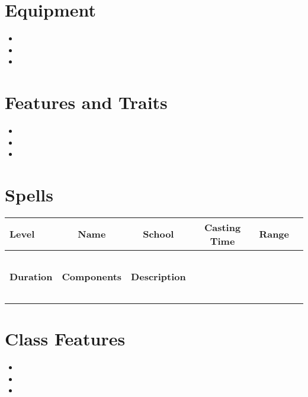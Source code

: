 \documentclass[12pt]{article}
\begin{document}
\section{Equipment}
\begin{itemize}[leftmargin=*]
\item 
\item 
\item 
\end{itemize}

\section{Features and Traits}
\begin{itemize}[leftmargin=*]
\item 
\item 
\item 
\end{itemize}

\section{Spells}
\begin{tabularx}{\linewidth}{lcccc}
\toprule
\textbf{Level} & \textbf{Name} & \textbf{School} & \textbf{Casting Time} & \textbf{Range} \\
\midrule
 &  &  &  &  \\
 &  &  &  &  \\
 &  &  &  &  \\
 &  &  &  &  \\
 &  &  &  &  \\

\textbf{Duration} & \textbf{Components} & \textbf{Description} \\
\midrule
 &  &  &  &  &  &  \\
 &  &  &  &  &  &  \\
 &  &  &  &  &  &  \\
 &  &  &  &  &  &  \\
 &  &  &  &  &  &  \\
\bottomrule
\end{tabularx}

\section{Class Features}
\begin{itemize}[leftmargin=*]
\item 
\item 
\item 
\end{itemize}
\end{document}
